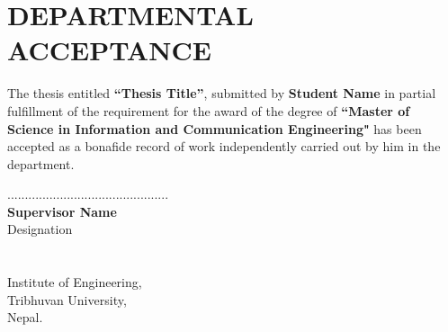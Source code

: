 \titlespacing{\chapter}{0pt}{150pt}{20pt}
\chapter*{DEPARTMENTAL ACCEPTANCE}
The thesis entitled \textbf{``Thesis Title''}, submitted by \textbf{Student Name} in partial fulfillment of the requirement for the award of the degree of \textbf{``Master of Science in Information and Communication Engineering"} has been accepted as a bonafide record of work independently carried out by him in the department.\par
\vspace{5cm}
..............................................\\
\textbf{Supervisor Name}\\
Designation\\
\\
\\
Institute of Engineering,\\
Tribhuvan University,\\
Nepal.
\newpage